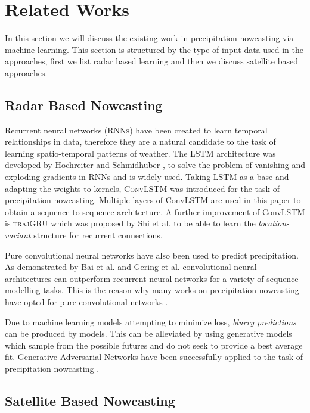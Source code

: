 \documentclass[acmtog, authorversion]{acmart}
\begin{document}
\section{Related Works}

In this section we will discuss the existing work in precipitation nowcasting via machine learning. This section is structured by the type of input data used in the approaches, first we list radar based learning and then we discuss satellite based approaches.

\subsection{Radar Based Nowcasting}

Recurrent neural networks (\textsc{RNNs}) have been created to learn temporal relationships in data, therefore they are a natural candidate to the task of learning spatio-temporal patterns of weather. The \textsc{LSTM} architecture was developed by Hochreiter and Schmidhuber \cite{lstm}, to solve the problem of vanishing and exploding gradients in RNNs and is widely used. Taking LSTM as a base and adapting the weights to kernels, \textsc{ConvLSTM} \cite{convlstm} was introduced for the task of precipitation nowcasting. Multiple layers of ConvLSTM are used in this paper to obtain a sequence to sequence architecture. A further improvement of ConvLSTM is \textsc{trajGRU} which was proposed by Shi et al. \cite{shi2017deep} to be able to learn the \textit{location-variant} structure for recurrent connections.
\medskip

Pure convolutional neural networks have also been used to predict precipitation. As demonstrated by Bai et al. and Gering et al. \cite{bai2018empirical, gehring2017convolutional} convolutional neural architectures can outperform recurrent neural networks for a variety of sequence modelling tasks. This is the reason why many works on precipitation nowcasting have opted for pure convolutional networks \cite{rainet,agrawal2019machine}.
\medskip

Due to machine learning models attempting to minimize loss, \textit{blurry predictions} can be produced by models. This can be alleviated by using generative models which sample from the possible futures and do not seek to provide a best average fit. Generative Adversarial Networks have been successfully applied to the task of precipitation nowcasting \cite{Ravuri_2021}.

\subsection{Satellite Based Nowcasting}
\end{document}
